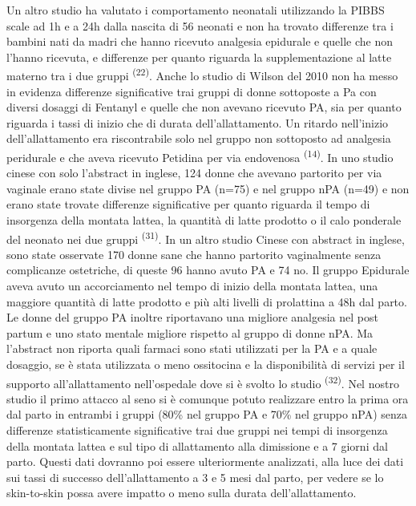 \documentclass[]{article}
\begin{document}
Un altro studio ha valutato i comportamento neonatali utilizzando la
PIBBS scale ad 1h e a 24h dalla nascita di 56 neonati e non ha trovato
differenze tra i bambini nati da madri che hanno ricevuto analgesia
epidurale e quelle che non l'hanno ricevuta, e differenze per quanto
riguarda la supplementazione al latte materno tra i due gruppi
\textsuperscript{(22)}. Anche lo studio di Wilson del 2010 non ha messo
in evidenza differenze significative trai gruppi di donne sottoposte a
Pa con diversi dosaggi di Fentanyl e quelle che non avevano ricevuto PA,
sia per quanto riguarda i tassi di inizio che di durata
dell'allattamento. Un ritardo nell'inizio dell'allattamento era
riscontrabile solo nel gruppo non sottoposto ad analgesia peridurale e
che aveva ricevuto Petidina per via endovenosa \textsuperscript{(14)}.
In uno studio cinese con solo l'abstract in inglese, 124 donne che
avevano partorito per via vaginale erano state divise nel gruppo PA
(n=75) e nel gruppo nPA (n=49) e non erano state trovate differenze
significative per quanto riguarda il tempo di insorgenza della montata
lattea, la quantità di latte prodotto o il calo ponderale del neonato
nei due gruppi \textsuperscript{(31)}. In un altro studio Cinese con
abstract in inglese, sono state osservate 170 donne sane che hanno
partorito vaginalmente senza complicanze ostetriche, di queste 96 hanno
avuto PA e 74 no. Il gruppo Epidurale aveva avuto un accorciamento nel
tempo di inizio della montata lattea, una maggiore quantità di latte
prodotto e più alti livelli di prolattina a 48h dal parto. Le donne del
gruppo PA inoltre riportavano una migliore analgesia nel post partum e
uno stato mentale migliore rispetto al gruppo di donne nPA. Ma
l'abstract non riporta quali farmaci sono stati utilizzati per la PA e a
quale dosaggio, se è stata utilizzata o meno ossitocina e la
disponibilità di servizi per il supporto all'allattamento nell'ospedale
dove si è svolto lo studio \textsuperscript{(32)}. Nel nostro studio il
primo attacco al seno si è comunque potuto realizzare entro la prima ora
dal parto in entrambi i gruppi (80\% nel gruppo PA e 70\% nel gruppo
nPA) senza differenze statisticamente significative trai due gruppi nei
tempi di insorgenza della montata lattea e sul tipo di allattamento alla
dimissione e a 7 giorni dal parto. Questi dati dovranno poi essere
ulteriormente analizzati, alla luce dei dati sui tassi di successo
dell'allattamento a 3 e 5 mesi dal parto, per vedere se lo skin-to-skin
possa avere impatto o meno sulla durata dell'allattamento.
\end{document}
